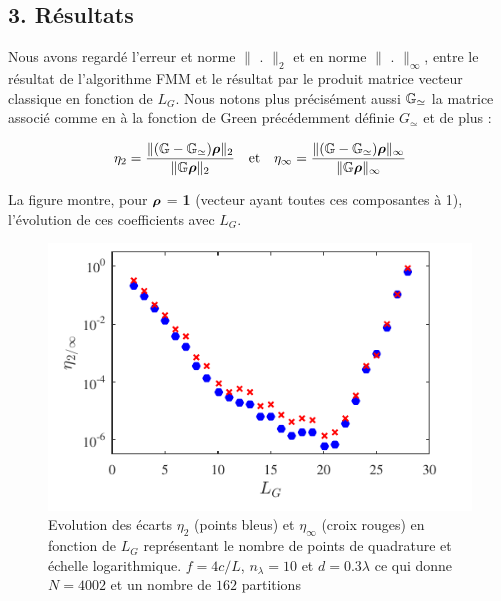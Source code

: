 \documentclass[10pt]{article}
\begin{document}
\begin{multicols}{2}
\vspace*{22pt}

\subsection*{3. Résultats}


Nous avons regardé l'erreur et norme $\| \text{ . }\|_{2}$ et en norme $\| \text{ . }\|_{\infty}$, entre le résultat de l'algorithme FMM et le résultat par le produit matrice vecteur classique en fonction de $L_G$. Nous notons plus précisément aussi $\mathbb{G}_{\simeq}$ la matrice associé comme en  à la fonction de Green précédemment définie $G_{\simeq}$ et de plus : 

\begin{equation}
\eta_{2} = \frac{\| (\mathbb{G} - \mathbb{G}_{\simeq}){\boldsymbol{\rho}} \|_{2}}{\| \mathbb{G}{\boldsymbol{\rho}} \|_{2}} \quad \text{et} \quad 
\eta_{\infty} = \frac{\| (\mathbb{G} - \mathbb{G}_{\simeq}){\boldsymbol{\rho}} \|_{\infty}}{\| \mathbb{G}{\boldsymbol{\rho}} \|_{\infty}} 
\end{equation}

La figure  montre, pour ${\boldsymbol{\rho}}$ = \textbf{1} (vecteur ayant toutes ces composantes à 1), l'évolution de ces coefficients avec $L_G$. 



\begin{figure}[H]
  \begin{center}
  \includegraphics[width=0.95\columnwidth]{Q6b_2.pdf}
  \vspace*{-11pt}
  \caption{Evolution des écarts $\eta_2$ (points bleus) et $\eta_{\infty}$ (croix rouges) en fonction de $L_G$ représentant le nombre de points de quadrature et échelle logarithmique. $f=4c/L$, $n_\lambda =10$ et $d=0.3\lambda$ ce qui donne $N = 4002$ et un nombre de $162$ partitions}
  \label{fig:Q6b}
  \end{center}
\end{figure}
\vspace*{-22pt}


\end{multicols}
\end{document}

